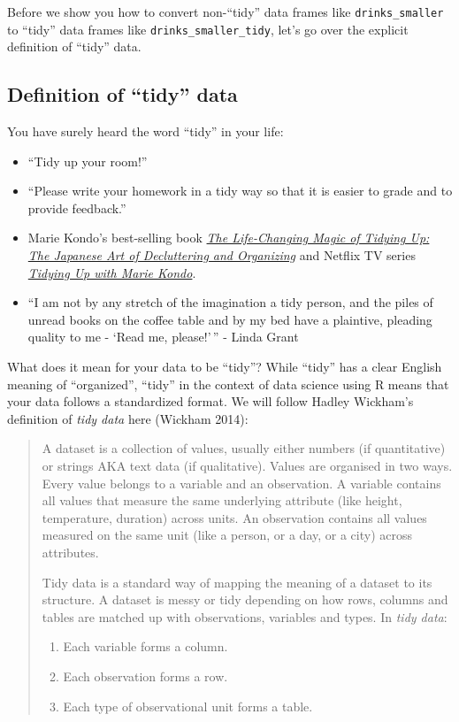 \documentclass[
  letterpaper,
  DIV=11,
  numbers=noendperiod]{scrreprt}
\providecommand{\tightlist}{%
  \setlength{\itemsep}{0pt}\setlength{\parskip}{0pt}}\usepackage{longtable,booktabs,array}
\theoremstyle{definition}
\theoremstyle{remark}
\begin{document}
Before we show you how to convert non-``tidy'' data frames like
\texttt{drinks\_smaller} to ``tidy'' data frames like
\texttt{drinks\_smaller\_tidy}, let's go over the explicit definition of
``tidy'' data.

\hypertarget{definition-of-tidy-data}{%
\subsection{Definition of ``tidy'' data}\label{definition-of-tidy-data}}

You have surely heard the word ``tidy'' in your life:

\begin{itemize}
\item
  ``Tidy up your room!''
\item
  ``Please write your homework in a tidy way so that it is easier to
  grade and to provide feedback.''
\item
  Marie Kondo's best-selling book
  \href{https://www.amazon.com/Life-Changing-Magic-Tidying-Decluttering-Organizing/dp/1607747308/ref=sr_1_1?ie=UTF8\&qid=1469400636\&sr=8-1\&keywords=tidying+up}{\emph{The
  Life-Changing Magic of Tidying Up: The Japanese Art of Decluttering
  and Organizing}} and Netflix TV series
  \href{https://www.netflix.com/title/80209379}{\emph{Tidying Up with
  Marie Kondo}}.
\item
  ``I am not by any stretch of the imagination a tidy person, and the
  piles of unread books on the coffee table and by my bed have a
  plaintive, pleading quality to me - `Read me, please!'\,'' - Linda
  Grant
\end{itemize}

What does it mean for your data to be ``tidy''? While ``tidy'' has a
clear English meaning of ``organized'', ``tidy'' in the context of data
science using R means that your data follows a standardized format. We
will follow Hadley Wickham's definition of \emph{tidy data} here
(Wickham 2014):

\begin{quote}
A dataset is a collection of values, usually either numbers (if
quantitative) or strings AKA text data (if qualitative). Values are
organised in two ways. Every value belongs to a variable and an
observation. A variable contains all values that measure the same
underlying attribute (like height, temperature, duration) across units.
An observation contains all values measured on the same unit (like a
person, or a day, or a city) across attributes.

Tidy data is a standard way of mapping the meaning of a dataset to its
structure. A dataset is messy or tidy depending on how rows, columns and
tables are matched up with observations, variables and types. In
\emph{tidy data}:

\begin{enumerate}
\def\labelenumi{\arabic{enumi}.}
\tightlist
\item
  Each variable forms a column.
\item
  Each observation forms a row.
\item
  Each type of observational unit forms a table.
\end{enumerate}
\end{quote}
\end{document}
